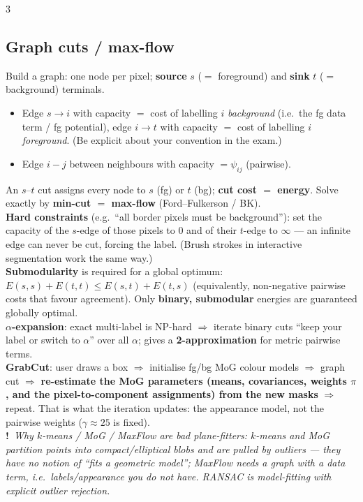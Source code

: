 \documentclass[9pt,a4paper,landscape]{extarticle}
\newcommand{\key}[1]{\textbf{#1}}
\newcommand{\tr}[1]{{\color{trap}\textbf{!}}\ \textit{#1}}
\begin{document}
\begin{multicols}{3}
\subsection{Graph cuts / max-flow}
Build a graph: one node per pixel; \key{source} $s$ ($=$ foreground) and \key{sink} $t$ ($=$ background) terminals.
\begin{itemize}
\item Edge $s\!\to\!i$ with capacity $=$ cost of labelling $i$ \emph{background} (i.e.\ the fg data term / fg potential), edge $i\!\to\!t$ with capacity $=$ cost of labelling $i$ \emph{foreground}. (Be explicit about your convention in the exam.)
\item Edge $i\!-\!j$ between neighbours with capacity $=\psi_{ij}$ (pairwise).
\end{itemize}
An $s$--$t$ cut assigns every node to $s$ (fg) or $t$ (bg); \key{cut cost $=$ energy}. Solve exactly by \key{min-cut $=$ max-flow} (Ford--Fulkerson / BK).\\
\key{Hard constraints} (e.g.\ ``all border pixels must be background''): set the capacity of the $s$-edge of those pixels to $0$ and of their $t$-edge to $\infty$ --- an infinite edge can never be cut, forcing the label. (Brush strokes in interactive segmentation work the same way.)\\
\key{Submodularity} is required for a global optimum: $E(s,s)+E(t,t)\le E(s,t)+E(t,s)$ (equivalently, non-negative pairwise costs that favour agreement). Only \key{binary, submodular} energies are guaranteed globally optimal.\\
\key{$\alpha$-expansion}: exact multi-label is NP-hard $\Rightarrow$ iterate binary cuts ``keep your label or switch to $\alpha$'' over all $\alpha$; gives a \key{2-approximation} for metric pairwise terms.\\
\key{GrabCut}: user draws a box $\Rightarrow$ initialise fg/bg MoG colour models $\Rightarrow$ graph cut $\Rightarrow$ \key{re-estimate the MoG parameters (means, covariances, weights $\pi$, and the pixel-to-component assignments) from the new masks} $\Rightarrow$ repeat. That is what the iteration updates: the appearance model, not the pairwise weights ($\gamma\approx25$ is fixed).\\
\tr{Why $k$-means / MoG / MaxFlow are bad plane-fitters: $k$-means and MoG partition points into compact/elliptical blobs and are pulled by outliers --- they have no notion of ``fits a geometric model''; MaxFlow needs a graph with a data term, i.e.\ labels/appearance you do not have. RANSAC is model-fitting with explicit outlier rejection.}


\end{multicols}
\end{document}
